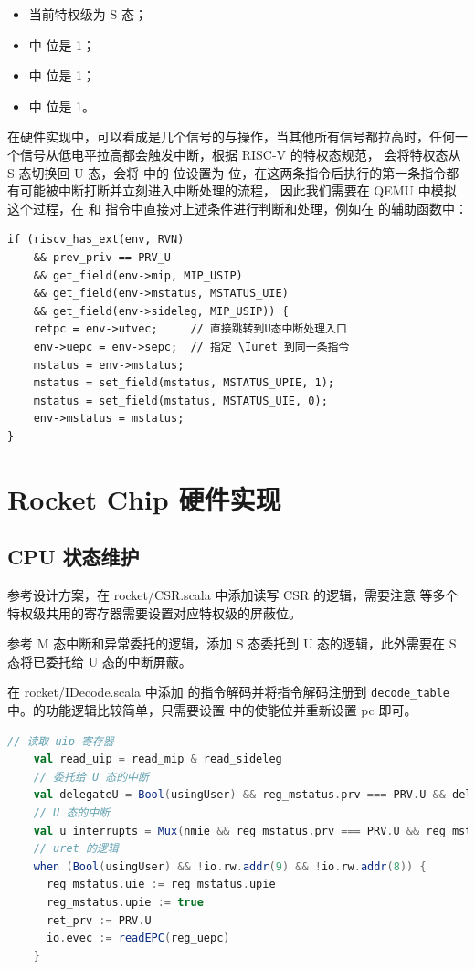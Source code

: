 \begin{itemize}
    \item 当前特权级为 S 态；
    \item \Rustatus 中 \FcsrUstatusUie 位是 1；
    \item \Ruie 中 \FcsrUieUsie 位是 1；
    \item \Ruip 中 \FcsrUipUsip 位是 1。
\end{itemize}

在硬件实现中，可以看成是几个信号的与操作，当其他所有信号都拉高时，任何一个信号从低电平拉高都会触发中断，根据 RISC-V 的特权态规范\cite{rvpriv110}，
\Isret 会将特权态从 S 态切换回 U 态，\Iuret 会将 \Rustatus 中的 \FcsrUstatusUie 位设置为 \FcsrUstatusUpie 位，在这两条指令后执行的第一条指令都有可能被中断打断并立刻进入中断处理的流程，
因此我们需要在 QEMU 中模拟这个过程，在 \Isret 和 \Iuret 指令中直接对上述条件进行判断和处理，例如在 \Isret 的辅助函数中：

\lstset{language=C}
\begin{lstlisting}[style=CStyle]
if (riscv_has_ext(env, RVN)
    && prev_priv == PRV_U
    && get_field(env->mip, MIP_USIP)
    && get_field(env->mstatus, MSTATUS_UIE)
    && get_field(env->sideleg, MIP_USIP)) {
    retpc = env->utvec;     // 直接跳转到U态中断处理入口
    env->uepc = env->sepc;  // 指定 \Iuret 到同一条指令
    mstatus = env->mstatus;
    mstatus = set_field(mstatus, MSTATUS_UPIE, 1);
    mstatus = set_field(mstatus, MSTATUS_UIE, 0);
    env->mstatus = mstatus;
}
\end{lstlisting}

\section{Rocket Chip 硬件实现}

\subsection{CPU 状态维护}

参考设计方案，在 rocket/CSR.scala 中添加读写 CSR 的逻辑，需要注意 \Ruip 等多个特权级共用的寄存器需要设置对应特权级的屏蔽位。

参考 M 态中断和异常委托的逻辑，添加 S 态委托到 U 态的逻辑，此外需要在 S 态将已委托给 U 态的中断屏蔽。

在 rocket/IDecode.scala 中添加 \Iuret 的指令解码并将指令解码注册到 \texttt{decode\_table} 中。\Iuret 的功能逻辑比较简单，只需要设置 \Rustatus 中的使能位并重新设置 pc 即可。

\begin{lstlisting}[style=CStyle,language=scala]
    // 读取 uip 寄存器
    val read_uip = read_mip & read_sideleg
    // 委托给 U 态的中断
    val delegateU = Bool(usingUser) && reg_mstatus.prv === PRV.U && delegate && read_sideleg(cause_lsbs) && cause(xLen - 1)
    // U 态的中断
    val u_interrupts = Mux(nmie && reg_mstatus.prv === PRV.U && reg_mstatus.uie, pending_interrupts & read_sideleg, UInt(0))
    // uret 的逻辑
    when (Bool(usingUser) && !io.rw.addr(9) && !io.rw.addr(8)) {
      reg_mstatus.uie := reg_mstatus.upie
      reg_mstatus.upie := true
      ret_prv := PRV.U
      io.evec := readEPC(reg_uepc)
    }
\end{lstlisting}

